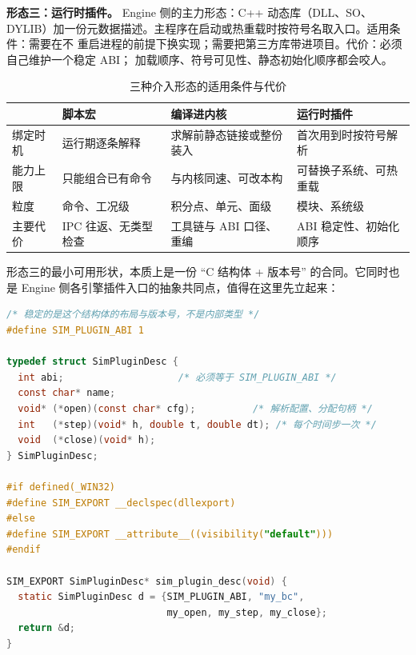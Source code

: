 \documentclass[12pt,a4paper,fontset=fandol]{ctexbook}
\newcommand{\Lang}[1]{\textsf{#1}}
\newcommand{\CL}{\Lang{C}}
\newcommand{\CPP}{\Lang{C++}}
\newcommand{\DomEngine}{\Lang{Engine}}
\begin{document}
\textbf{形态三：运行时插件。} \DomEngine{} 侧的主力形态：\CPP{} 动态库（DLL、SO、
DYLIB）加一份元数据描述。主程序在启动或热重载时按符号名取入口。适用条件：需要在不
重启进程的前提下换实现；需要把第三方库带进项目。代价：必须自己维护一个稳定 ABI；
加载顺序、符号可见性、静态初始化顺序都会咬人。

\begin{table}[htbp]
\centering
\caption{三种介入形态的适用条件与代价}
\label{tab:ch01-forms}
\begin{tabular}{>{\raggedright\arraybackslash}p{}
                >{\raggedright\arraybackslash}p{}
                >{\raggedright\arraybackslash}p{}
                >{\raggedright\arraybackslash}p{}}
\toprule
 & \textbf{脚本宏} & \textbf{编译进内核} & \textbf{运行时插件} \\
\midrule
绑定时机 & 运行期逐条解释 & 求解前静态链接或整份装入 & 首次用到时按符号解析 \\
能力上限 & 只能组合已有命令 & 与内核同速、可改本构 & 可替换子系统、可热重载 \\
粒度 & 命令、工况级 & 积分点、单元、面级 & 模块、系统级 \\
主要代价 & IPC 往返、无类型检查 & 工具链与 ABI 口径、重编 & ABI 稳定性、初始化顺序 \\
\bottomrule
\end{tabular}
\end{table}

形态三的最小可用形状，本质上是一份 ``\CL{} 结构体 + 版本号'' 的合同。它同时也是
\DomEngine{} 侧各引擎插件入口的抽象共同点，值得在这里先立起来：

\begin{lstlisting}[language=C, style=cstyle,
  caption={运行时插件的极简 ABI：入口符号只有一个，返回一份合同},
  label={lst:ch01-plugin-abi}]
/* 稳定的是这个结构体的布局与版本号，不是内部类型 */
#define SIM_PLUGIN_ABI 1

typedef struct SimPluginDesc {
  int abi;                    /* 必须等于 SIM_PLUGIN_ABI */
  const char* name;
  void* (*open)(const char* cfg);          /* 解析配置、分配句柄 */
  int   (*step)(void* h, double t, double dt); /* 每个时间步一次 */
  void  (*close)(void* h);
} SimPluginDesc;

#if defined(_WIN32)
#define SIM_EXPORT __declspec(dllexport)
#else
#define SIM_EXPORT __attribute__((visibility("default")))
#endif

SIM_EXPORT SimPluginDesc* sim_plugin_desc(void) {
  static SimPluginDesc d = {SIM_PLUGIN_ABI, "my_bc",
                            my_open, my_step, my_close};
  return &d;
}
\end{lstlisting}
\end{document}
